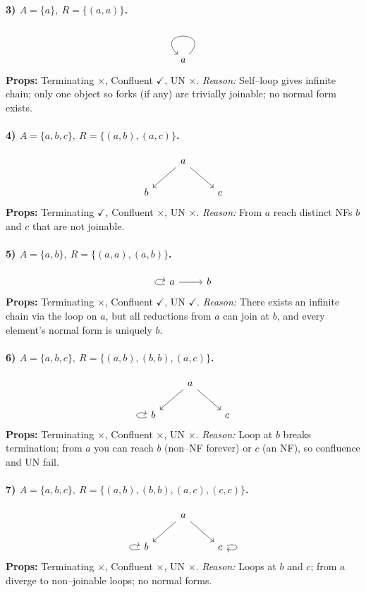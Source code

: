 \documentclass{article}
\theoremstyle{theorem}
\theoremstyle{definition}
\theoremstyle{remark}
\begin{document}
\paragraph{3) \(A=\{a\},\ R=\{(a,a)\}\).}
\[
\begin{tikzcd}
a \arrow[out=45,in=135,loop, ""]
\end{tikzcd}
\]
\textbf{Props:} Terminating \(\times\), Confluent \(\checkmark\), UN \(\times\). \emph{Reason:} Self–loop gives infinite chain; only one object so forks (if any) are trivially joinable; no normal form exists.

\paragraph{4) \(A=\{a,b,c\},\ R=\{(a,b),(a,c)\}\).}
\[
\begin{tikzcd}
& a \arrow[dl] \arrow[dr] & \\
b & & c
\end{tikzcd}
\]
\textbf{Props:} Terminating \(\checkmark\), Confluent \(\times\), UN \(\times\). \emph{Reason:} From \(a\) reach distinct NFs \(b\) and \(c\) that are not joinable.

\paragraph{5) \(A=\{a,b\},\ R=\{(a,a),(a,b)\}\).}
\[
\begin{tikzcd}
a \arrow[loop left] \arrow[r] & b
\end{tikzcd}
\]
\textbf{Props:} Terminating \(\times\), Confluent \(\checkmark\), UN \(\checkmark\). \emph{Reason:} There exists an infinite chain via the loop on \(a\), but all reductions from \(a\) can join at \(b\), and every element’s normal form is uniquely \(b\).

\paragraph{6) \(A=\{a,b,c\},\ R=\{(a,b),(b,b),(a,c)\}\).}
\[
\begin{tikzcd}
& a \arrow[dl] \arrow[dr] & \\
b \arrow[loop left] & & c
\end{tikzcd}
\]
\textbf{Props:} Terminating \(\times\), Confluent \(\times\), UN \(\times\). \emph{Reason:} Loop at \(b\) breaks termination; from \(a\) you can reach \(b\) (non–NF forever) or \(c\) (an NF), so confluence and UN fail.

\paragraph{7) \(A=\{a,b,c\},\ R=\{(a,b),(b,b),(a,c),(c,c)\}\).}
\[
\begin{tikzcd}
& a \arrow[dl] \arrow[dr] & \\
b \arrow[loop left] & & c \arrow[loop right]
\end{tikzcd}
\]
\textbf{Props:} Terminating \(\times\), Confluent \(\times\), UN \(\times\). \emph{Reason:} Loops at \(b\) and \(c\); from \(a\) diverge to non–joinable loops; no normal forms.
\end{document}
